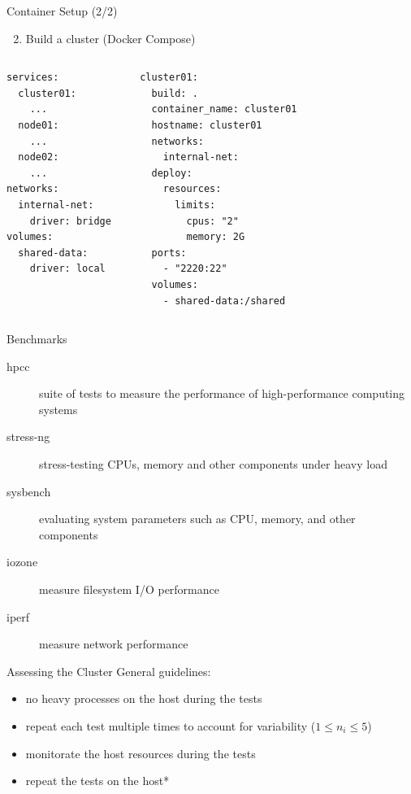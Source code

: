 \documentclass[10pt]{beamer}
\begin{document}
\begin{frame}[fragile]{Container Setup (2/2)}
\begin{enumerate}
\setcounter{enumi}{1}
\item Build a cluster (\alert{Docker Compose})
\end{enumerate}
\begin{columns}
{\footnotesize\begin{verbatim}
services:
  cluster01:
    ...
  node01:
    ...
  node02:
    ...    
networks:
  internal-net:
    driver: bridge
volumes:
  shared-data:
    driver: local
\end{verbatim}}
  {\footnotesize\begin{verbatim}
  cluster01:
    build: .
    container_name: cluster01
    hostname: cluster01
    networks:
      internal-net:  
    deploy:
      resources:
        limits:
          cpus: "2"
          memory: 2G
    ports:
      - "2220:22"
    volumes:
      - shared-data:/shared    
\end{verbatim}}

\end{columns}
  
\end{frame}

\begin{frame}{Benchmarks}
  \begin{description}
    \item[hpcc] suite of tests to measure the performance of high-performance computing systems
    \item[stress-ng] stress-testing CPUs, memory and other components under heavy load
    \item[sysbench] evaluating system parameters such as CPU, memory, and other components
    \item[iozone] measure filesystem I/O performance
    \item[iperf] measure network performance  
  \end{description}
\end{frame}

\begin{frame}{Assessing the Cluster}
  General guidelines:
  \begin{itemize}
    \item no heavy processes on the host during the tests
    \item repeat each test multiple times to account for variability ($1\leq n_i \leq 5$)
    \item monitorate the host resources during the tests
    \item repeat the tests on the host*
  \end{itemize}
  \end{frame}
\end{document}
